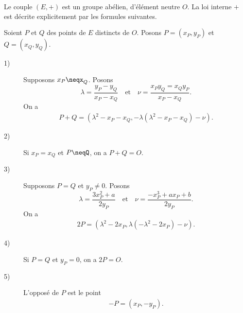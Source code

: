 \begin{theoreme}
    \label{th:theoreme1}
    Le couple $\left( E,+ \right) $ est un groupe abélien, d'élément neutre $O$. La loi interne $+$ est décrite explicitement par les formules suivantes.

    Soient $P$ et $Q$ des points de $E$ distincts de $O$. Posons $P=\left( x_P,y_P \right) $ et $Q=\left( x_Q,y_Q \right) $.

    \begin{description}
        \item[1)] Supposons $x_P\neqx_Q$. Posons 
            \[
            \lambda=\frac{y_P-y_Q}{x_P-x_Q} \quad \text{et} \quad \nu=\frac{x_Py_Q=x_Qy_P}{x_P-x_Q}
            .\] 
            On a 
            \begin{align}
                \label{eq:add1}
            P+Q=\left( \lambda^2-x_P-x_Q,-\lambda\left( \lambda^2-x_P-x_Q \right) -\nu  \right) 
            .\end{align}
            \item[2)] Si $x_P=x_Q$ et $P\neqQ$, on a $P+Q=O$.
            \item[3)] Supposons $P=Q$ et $y_P\neq 0$. Posons 
                \[
                \lambda=\frac{3x_P^2+a}{2y_P} \quad \text{et} \quad \nu=\frac{-x_P^3+ax_P+b}{2y_P}
                .\] 
                On a 
                \begin{align}
                    \label{eq:add2}
                2P=\left( \lambda^2-2x_P,\lambda\left( -\lambda^2-2x_P \right) -\nu \right) 
                .\end{align}
        \item[4)] Si $P=Q$ et $y_P=0$, on a $2P=O$.
        \item[5)] L'opposé de $P$ est le point
            \begin{align}
                \label{eq:add3}
                -P=\left( x_P,-y_P \right) 
            .\end{align}
    \end{description}
\end{theoreme}


